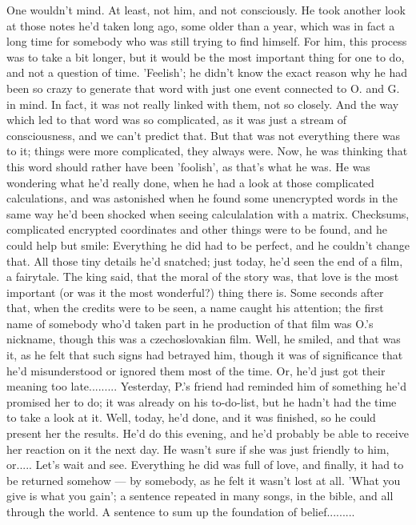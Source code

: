 One wouldn't mind. At least, not him, and not consciously. 
He took another look at those notes he'd taken long ago, some older than a year, which was in fact a long time for somebody who was still trying to find himself. For him, this process was to take a bit longer, but it would be the most important thing for one to do, and not a question of time. 
'Feelish'; he didn't know the exact reason why he had been so crazy to generate that word with just one event connected to O. and G. in mind. In fact, it was not really linked with them, not so closely. And the way which led to that word was so complicated, as it was just a stream of consciousness, and we can't predict that. 
But that was not everything there was to it; things were more complicated, they always were. Now, he was thinking that this word should rather have been 'foolish', as that's what he was. He was wondering what he'd really done, when he had a look at those complicated calculations, and was astonished when he found some unencrypted words in the same way he'd been shocked when seeing calculalation with a matrix. Checksums, complicated encrypted coordinates and other things were to be found, and he could help but smile: Everything he did had to be perfect, and he couldn't change that. 
All those tiny details he'd snatched; just today, he'd seen the end of a film, a fairytale. The king said, that the moral of the story was, that love is the most important (or was it the most wonderful?) thing there is. Some seconds after that, when the credits were to be seen, a name caught his attention; the first name of somebody who'd taken part in he production of that film was O.'s nickname, though this was a czechoslovakian film. 
Well, he smiled, and that was it, as he felt that such signs had betrayed him, though it was of significance that he'd misunderstood or ignored them most of the time. 
Or, he'd just got their meaning too late.........
Yesterday, P.'s friend had reminded him of something he'd promised her to do; it was already on his to-do-list, but he hadn't had the time to take a look at it. Well, today, he'd done, and it was finished, so he could present her the results. 
He'd do this evening, and he'd probably be able to receive her reaction on it the next day. 
He wasn't sure if she was just friendly to him, or.....
Let's wait and see. Everything he did was full of love, and finally, it had to be returned somehow --- by somebody, as he felt it wasn't lost at all. 
'What you give is what you gain'; a sentence repeated in many songs, in the bible, and all through the world. A sentence to sum up the foundation of belief.........
